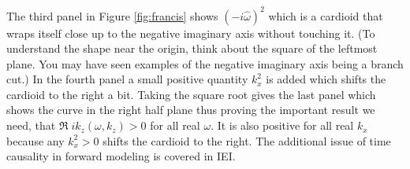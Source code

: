 \par
The third panel in Figure \ref{fig:francis}
shows $(-i \hat\omega)^2$ which is a cardioid that
wraps itself close up to the negative imaginary axis without touching it.
(To understand the shape near the origin, think about the square
of the leftmost plane.  You may have seen examples
of the negative imaginary axis being a branch cut.)
In the fourth panel a small positive quantity $k_x^2$ is added which
shifts the cardioid to the right a bit.
Taking the square root gives the last panel
which shows the curve in the right half plane
thus proving
the important result we need,
that $\Re\; ik_z(\omega,k_z)>0$ for all real $\omega$.
It is also positive for all real $k_x$ because
any $k_x^2>0$ shifts the cardioid to the right.
The additional issue of time causality in forward modeling
is covered in IEI.
\par
\begin{comment}
Luckily the Fortran {\tt csqrt()} function assumes the phase of
the argument is between $\pm 180^\circ$
exactly as we need here.
Thus the square root itself will have a phase between $\pm 90^\circ$
as we require.
In applications, $\epsilon$
would typically be chosen proportional to the maximum time on the data.
Thus the mathematical expression $-i\omega + \epsilon$
might be rendered in Fortran as 
{\tt cmplx(qi,-omega)}
where
{\tt qi=1./tmax}
and the whole concept implemented as in function~\texttt{eiktau()} \vpageref{lst:eiktau}.
Do not set {\tt qi=0} because then the {\tt csqrt()} function
cannot decipher positive from negative frequencies.

\progdex{eiktau}{exp ikz}
\end{comment}

